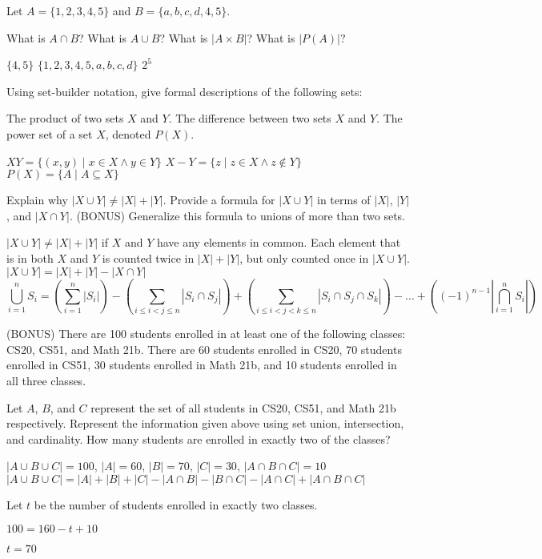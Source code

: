 \documentclass[solution, letterpaper]{cs20inclass}
\begin{document}
\pagebreak

\problem Let $A = \{1,2,3,4,5\}$ and $B = \{a,b,c,d,4,5\}$.

\subproblem What is $A \cap B$?
\subproblem What is $A \cup B$?
\subproblem What is $|A \times B|$?
\subproblem What is $|P(A)|$?

\begin{solution}
\subsolution $\{4,5\}$
\subsolution $\{1,2,3,4,5,a,b,c,d\}$
\subsolution $2^5$
\end{solution}


\problem
Using set-builder notation, give formal descriptions of the following sets:

\subproblem The product of two sets $X$ and $Y$.
\subproblem The difference between two sets $X$ and $Y$.
\subproblem The power set of a set $X$, denoted $P(X)$.

\begin{solution}
\subsolution $XY = \{(x,y) \mid x \in X \wedge y \in Y\}$
\subsolution $X-Y = \{z \mid z \in X \wedge z \notin Y\}$
\subsolution $P(X) = \{A \mid A \subseteq X \}$
\end{solution}


\problem

\subproblem Explain why $|X \cup Y| \neq |X| + |Y|$. 
\subproblem Provide a formula for $|X \cup Y|$ in terms of $|X|$, $|Y|$, and $|X \cap Y|$.
\subproblem (BONUS) Generalize this formula to unions of more than two sets.

\begin{solution}
\subsolution $|X \cup Y| \neq |X| + |Y|$ if $X$ and $Y$ have any elements in common. Each element that is in both $X$ and $Y$ is counted twice in $|X| + |Y|$, but only counted once in $|X \cup Y|$.
\subsolution $|X \cup Y| = |X| + |Y| - |X \cap Y|$ 
\subsolution $$\bigcup_{i=1}^n S_i = (\sum_{i=1}^n |S_i|) - (\sum_{i \leq i < j \leq n} |S_i \cap S_j|) + (\sum_{i \leq i < j < k \leq n} |S_i \cap S_j \cap S_k|) - \dots + ((-1)^{n-1} |\bigcap_{i=1}^n S_i|)$$
\end{solution}


\problem
(BONUS) There are 100 students enrolled in at least one of the following classes: CS20, CS51, and Math 21b. There are 60 students enrolled in CS20, 70 students enrolled in CS51, 30 students enrolled in Math 21b, and 10 students enrolled in all three classes.

\subproblem Let $A$, $B$, and $C$ represent the set of all students in CS20, CS51, and Math 21b respectively. Represent the information given above using set union, intersection, and cardinality.
\subproblem How many students are enrolled in exactly two of the classes?

\begin{solution}
\subsolution $|A \cup B \cup C| = 100$, $|A| = 60$, $|B| = 70$, $|C| = 30$, $|A \cap B \cap C| = 10$
\subsolution $|A \cup B \cup C| = |A| + |B| + |C| - |A \cap B| - |B \cap C| - |A \cap C| + |A \cap B \cap C|$

Let $t$ be the number of students enrolled in exactly two classes.

$100 = 160 - t + 10$

$t = 70$
\end{solution}
\end{document}
